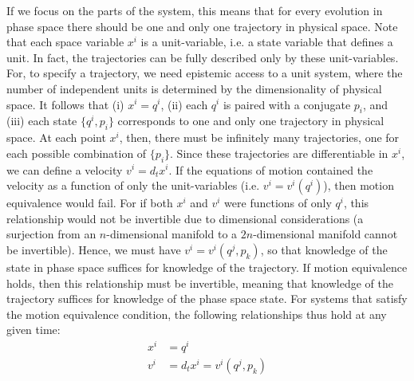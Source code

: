 \documentclass[12pt, english, twoside]{article} %
\begin{document}
If we focus on the parts of the system, this means that for every evolution in phase space there should be one and only one trajectory in physical space. Note that each space variable $x^i$ is a unit-variable, i.e. a state variable that defines a unit. In fact, the trajectories can be fully described only by these unit-variables. For, to specify a trajectory, we need epistemic access to a unit system, where the number of independent units is determined by the dimensionality of physical space. It follows that (i) $x^i = q^i$, (ii) each $q^i$ is paired with a conjugate $p_i$, and (iii) each state $\{q^i, p_i\}$ corresponds to one and only one trajectory in physical space. At each point $x^i$, then, there must be infinitely many trajectories, one for each possible combination of $\{p_i\}$. Since these trajectories are differentiable in $x^i$, we can define a velocity $v^i = d_t x^i$. If the equations of motion contained the velocity as a function of only the unit-variables (i.e. $v^i=v^i(q^i)$), then motion equivalence would fail. For if both $x^i$ and $v^i$ were functions of only $q^i$, this relationship would not be invertible due to dimensional considerations (a surjection from an $n$-dimensional manifold to a $2n$-dimensional manifold cannot be invertible). Hence, we must have $v^i=v^i(q^j, p_k)$, so that knowledge of the state in phase space suffices for knowledge of the trajectory. If motion equivalence holds, then this relationship must be invertible, meaning that knowledge of the trajectory suffices for knowledge of the phase space state. For systems that satisfy the motion equivalence condition, the following relationships thus hold at any given time:
\begin{equation}\label{weak_equivalence}
\begin{aligned}
x^i &= q^i \\
v^i &= d_t x^i = v^i(q^j, p_k)
\end{aligned}
\end{equation}
\end{document}

